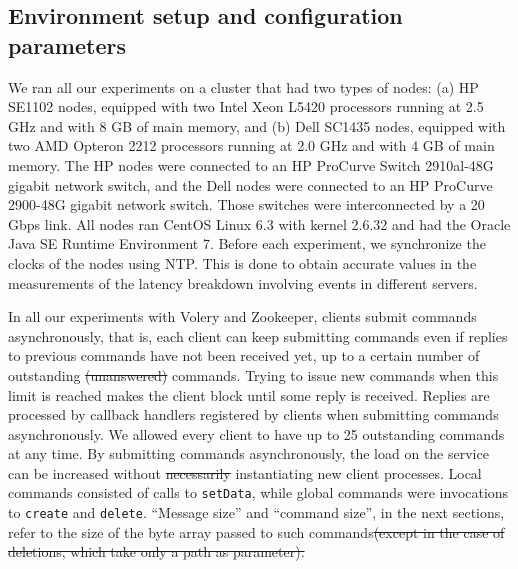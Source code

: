 \documentclass[10pt, conference, compsocconf, letterpaper]{IEEEtranv17}
\providecommand{\DIFadd}[1]{{\protect\color{blue}\uwave{#1}}} %
\providecommand{\DIFdel}[1]{{\protect\color{red}\sout{#1}}}                      %
\providecommand{\DIFaddbegin}{} %
\providecommand{\DIFaddend}{} %
\providecommand{\DIFdelbegin}{} %
\providecommand{\DIFdelend}{} %
\begin{document}
\subsection{Environment setup and configuration parameters}
\label{sec:environment}

We ran all our experiments on a cluster that had two types of nodes: (a) HP SE1102 nodes, equipped with two Intel Xeon L5420 processors running at 2.5 GHz and with 8 GB of main memory, and (b) Dell SC1435 nodes, equipped with two AMD Opteron 2212 processors running at 2.0 GHz and with 4 GB of main memory. The HP nodes were connected to an HP ProCurve Switch 2910al-48G gigabit network switch, and the Dell nodes were connected to an HP ProCurve 2900-48G gigabit network switch. Those switches were interconnected by a 20 Gbps link. 
All nodes ran CentOS Linux 6.3 with kernel 2.6.32 and had the Oracle Java SE Runtime Environment 7.
Before each experiment, we synchronize the clocks of the nodes using NTP.
This is done to obtain accurate values in the measurements of the latency breakdown involving events in different servers.

In all our experiments with Volery and Zookeeper, clients submit commands asynchronously, that is, each client can keep submitting commands even if replies to previous commands have not been received yet, up to a certain number of outstanding \DIFdelbegin \DIFdel{(unanswered) }\DIFdelend commands. 
Trying to issue new commands when this limit is reached makes the client block until some reply is received. 
Replies are processed by callback handlers registered by clients when submitting commands asynchronously. 
We allowed every client to have up to 25 outstanding commands at any time. 
By submitting commands asynchronously, the load on the service can be increased without \DIFdelbegin \DIFdel{necessarily }\DIFdelend instantiating new client processes.
Local commands consisted of calls to \verb#setData#, while global commands were invocations to \verb#create# and \verb#delete#. 
``Message size'' and ``command size'', in the next sections, refer to the size of the byte array passed to such commands\DIFdelbegin \DIFdel{(except in the case of deletions, which take only a path as parameter).
}\DIFdelend \DIFaddbegin \DIFadd{.
}\DIFaddend 
\end{document}
